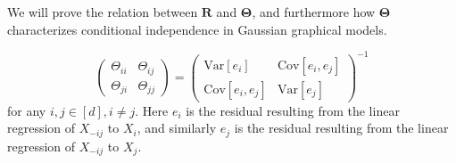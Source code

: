 \documentclass[a3paper,12pt]{extarticle} %
\begin{document}
We will prove the relation between \( \mathbf{R} \) and \( \boldsymbol{\Theta} \), and furthermore how \( \boldsymbol{\Theta} \) characterizes conditional independence in Gaussian graphical models.

\[
        \begin{pmatrix}
        \Theta_{ii} & \Theta_{ij} \\
        \Theta_{ji} & \Theta_{jj}
        \end{pmatrix}
        =
        \begin{pmatrix}
        \text{Var}[e_i] & \text{Cov}[e_i, e_j] \\
        \text{Cov}[e_i, e_j] & \text{Var}[e_j]
        \end{pmatrix}^{-1}
\]
    for any \(i, j \in [d], i \neq j\). Here \(e_i\) is the residual resulting from the linear regression of \(X_{-ij}\) to \(X_i\), and similarly \(e_j\) is the residual resulting from the linear regression of \(X_{-ij}\) to \(X_j\).
\end{document}
